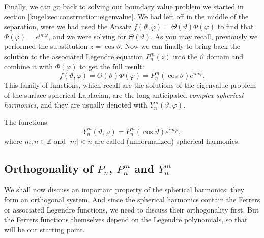 Finally, we can go back to solving our boundary value problem we started in
section \ref{kugel:sec:construction:eigenvalue}. We had left off in the middle
of the separation, were we had used the Ansatz $f(\vartheta, \varphi) =
\Theta(\vartheta) \Phi(\varphi)$ to find that $\Phi(\varphi) = e^{im\varphi}$,
and we were solving for $\Theta(\vartheta)$.  As you may recall, previously we
performed the substitution $z = \cos \vartheta$. Now we can finally to bring back the
solution to the associated Legendre equation $P^m_n(z)$ into the $\vartheta$
domain and combine it with $\Phi(\varphi)$ to get the full result:
\begin{equation*}
    f(\vartheta, \varphi)
      = \Theta(\vartheta)\Phi(\varphi)
      = P^m_n (\cos \vartheta) e^{im\varphi}.
\end{equation*}
This family of functions, which recall are the solutions of the eigenvalue
problem of the surface spherical Laplacian, are the long anticipated
\emph{complex spherical harmonics}, and they are usually denoted with
$Y^m_n(\vartheta, \varphi)$.

\begin{definition}
  \label{kugel:def:spherical-harmonics}
  The functions
  \begin{equation*}
    Y^m_n (\vartheta, \varphi) = P^m_n(\cos \vartheta) e^{im\varphi},
  \end{equation*}
  where $m, n \in \mathbb{Z}$ and $|m| < n$ are called (unnormalized) spherical
  harmonics.
\end{definition}

\begin{figure}
  \centering
  \kugelplaceholderfig{\textwidth}{.8\paperheight}
  \caption{
    \label{kugel:fig:spherical-harmonics}
  }
\end{figure}


\subsection{Orthogonality of $P_n$, $P^m_n$ and $Y^m_n$}

We shall now discuss an important property of the spherical harmonics: they form
an orthogonal system. And since the spherical harmonics contain the Ferrers or
associated Legendre functions, we need to discuss their orthogonality first.
But the Ferrers functions themselves depend on the Legendre polynomials, so that
will be our starting point.

